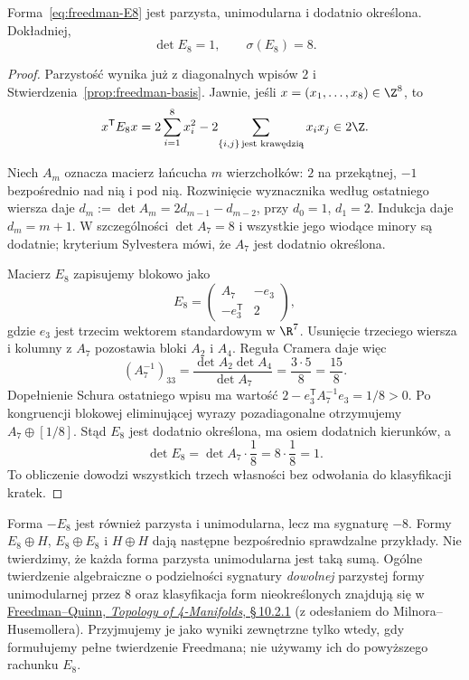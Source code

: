 \begin{stwierdzenie}
\label{prop:freedman-E8-properties}
Forma~\eqref{eq:freedman-E8} jest parzysta,
unimodularna i dodatnio określona. Dokładniej,
\[
 \det E_8=1,\qquad \sigma(E_8)=8.
\]
\end{stwierdzenie}
\begin{proof}
Parzystość wynika już z diagonalnych wpisów $2$
i Stwierdzenia~\ref{prop:freedman-basis}. Jawnie,
jeśli $x=(x_1,\ldots,x_8)\in\Z^8$, to
\[
 x^{\mathsf T}E_8x
 =2\sum_{i=1}^8x_i^2
       -2\!\sum_{\{i,j\}\,\text{jest krawędzią}}x_ix_j
 \in2\Z.
\]

Niech $A_m$ oznacza macierz łańcucha $m$ wierzchołków:
$2$ na przekątnej, $-1$ bezpośrednio nad nią i pod nią.
Rozwinięcie wyznacznika według ostatniego wiersza daje
$d_m:=\det A_m=2d_{m-1}-d_{m-2}$, przy
$d_0=1$, $d_1=2$. Indukcja daje $d_m=m+1$.
W szczególności $\det A_7=8$ i wszystkie jego wiodące
minory są dodatnie; kryterium Sylvestera mówi,
że $A_7$ jest dodatnio określona.

Macierz $E_8$ zapisujemy blokowo jako
\[
 E_8=\begin{pmatrix}A_7&-e_3\\-e_3^{\mathsf T}&2\end{pmatrix},
\]
gdzie $e_3$ jest trzecim wektorem standardowym
w $\R^7$. Usunięcie trzeciego wiersza i kolumny
z $A_7$ pozostawia bloki $A_2$ i $A_4$.
Reguła Cramera daje więc
\[
 (A_7^{-1})_{33}
 =\frac{\det A_2\det A_4}{\det A_7}
 =\frac{3\cdot5}{8}=\frac{15}{8}.
\]
Dopełnienie Schura ostatniego wpisu ma wartość
$2-e_3^{\mathsf T}A_7^{-1}e_3=1/8>0$.
Po kongruencji blokowej eliminującej wyrazy
pozadiagonalne otrzymujemy
$A_7\oplus[1/8]$. Stąd $E_8$ jest dodatnio
określona, ma osiem dodatnich kierunków, a
\[
 \det E_8=\det A_7\cdot\frac18=8\cdot\frac18=1.
\]
To obliczenie dowodzi wszystkich trzech własności
bez odwołania do klasyfikacji kratek.
\end{proof}

Forma $-E_8$ jest również parzysta i unimodularna,
lecz ma sygnaturę $-8$. Formy $E_8\oplus H$,
$E_8\oplus E_8$ i $H\oplus H$ dają następne
bezpośrednio sprawdzalne przykłady. Nie twierdzimy,
że każda forma parzysta unimodularna jest taką sumą.
Ogólne twierdzenie algebraiczne o podzielności
sygnatury \emph{dowolnej} parzystej formy unimodularnej
przez $8$ oraz klasyfikacja form nieokreślonych
znajdują się w \href{https://archive.mpim-bonn.mpg.de/4789/2/FreedmanQuinn-TopologyOf4Manifolds-Reformatted2013.pdf}
{Freedman--Quinn, \emph{Topology of 4-Manifolds},
\S\,10.2.1} (z odesłaniem do Milnora--Husemollera).
Przyjmujemy je jako wyniki zewnętrzne tylko wtedy,
gdy formułujemy pełne twierdzenie Freedmana;
nie używamy ich do powyższego rachunku $E_8$.

